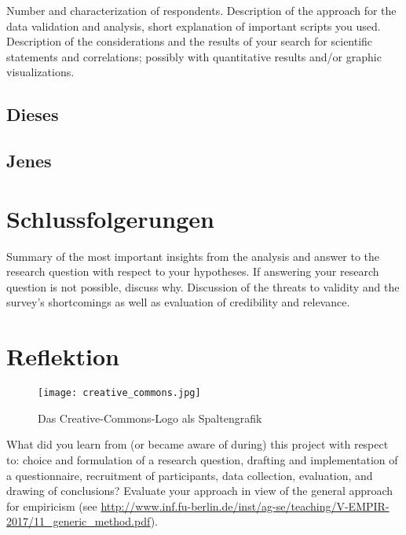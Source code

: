 \documentclass[de]{agse-empir-report}\usepackage[]{graphicx}\usepackage[]{color}
\begin{document}
Number and characterization of respondents.
Description of the approach for the data validation and
analysis, short explanation of important scripts you used.
Description of the considerations and the results of your search for
scientific statements and correlations; possibly with quantitative
results and/or graphic visualizations.

\lipsum[5]


\subsection{Dieses}
\lipsum[6]


\subsection[mds]{Jenes}
\lipsum[7-8]


\section[hs]{Schlussfolgerungen}
Summary of the most important insights from the analysis and
answer to the research question with respect to your hypotheses.
If answering your research question is not possible, discuss why.
Discussion of the threats to validity and the survey's
shortcomings as well as evaluation of credibility and relevance.

\lipsum[9-10]


\section[kk]{Reflektion}

\begin{figure}
    \texttt{[image: creative\_commons.jpg]}
    \caption{Das Creative-Commons-Logo als Spaltengrafik}
\end{figure}

What did you learn from (or became aware of during) this project with
respect to: choice and formulation of a research question,
drafting and implementation of a questionnaire,
recruitment of participants,
data collection, evaluation, and drawing of conclusions?
Evaluate your approach in view of the general approach for
empiricism (see
\url{http://www.inf.fu-berlin.de/inst/ag-se/teaching/V-EMPIR-2017/11_generic_method.pdf}).

\lipsum[11-13]
\end{document}
